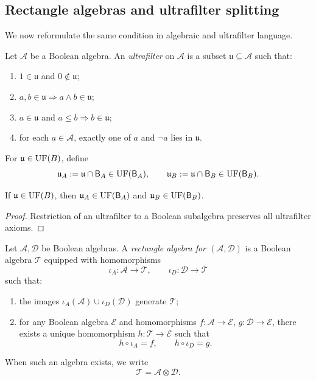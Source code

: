 \subsection{Rectangle algebras and ultrafilter splitting}
We now reformulate the same condition in algebraic and ultrafilter
language.
\begin{definition}[Ultrafilter]
	Let \(\mathcal A\) be a Boolean algebra. An \emph{ultrafilter} on
	\(\mathcal A\) is a subset \(\mathfrak u\subseteq\mathcal A\) such that:
	\begin{enumerate}
		\item \(1\in\mathfrak u\) and \(0\notin\mathfrak u\);
		\item \(a,b\in\mathfrak u\Rightarrow a\wedge b\in\mathfrak u\);
		\item \(a\in\mathfrak u\) and \(a\le b\Rightarrow b\in\mathfrak u\);
		\item for each \(a\in\mathcal A\), exactly one of \(a\) and \(\neg a\)
		      lies in \(\mathfrak u\).
	\end{enumerate}
\end{definition}
\begin{definition}[Marginals]
	For \(\mathfrak u\in\operatorname{UF}(B)\), define
	\[
		\mathfrak u_A:=\mathfrak u\cap\mathsf B_A\in\operatorname{UF}(\mathsf B_A),
		\qquad
		\mathfrak u_B:=\mathfrak u\cap\mathsf B_B\in\operatorname{UF}(\mathsf B_B).
	\]
\end{definition}
\begin{lemma}
	\label{lem:marginals}
	If \(\mathfrak u\in\operatorname{UF}(B)\), then \(\mathfrak u_A\in\operatorname{UF}(\mathsf B_A)\) and
	\(\mathfrak u_B\in\operatorname{UF}(\mathsf B_B)\).
\end{lemma}
\begin{proof}
	Restriction of an ultrafilter to a Boolean subalgebra preserves all
	ultrafilter axioms.
\end{proof}
\begin{definition}
	Let \(\mathcal A,\mathcal D\) be Boolean algebras. A \emph{rectangle
		algebra for \((\mathcal A,\mathcal D)\)} is a Boolean algebra
	\(\mathcal T\) equipped with homomorphisms
	\[
		\iota_A:\mathcal A\to\mathcal T,
		\qquad
		\iota_D:\mathcal D\to\mathcal T
	\]
	such that:
	\begin{enumerate}
		\item the images \(\iota_A(\mathcal A)\cup\iota_D(\mathcal D)\)
		      generate \(\mathcal T\);
		\item for any Boolean algebra \(\mathcal E\) and homomorphisms
		      \(f:\mathcal A\to\mathcal E\), \(g:\mathcal D\to\mathcal E\), there
		      exists a unique homomorphism \(h:\mathcal T\to\mathcal E\) such that
		      \[
			      h\circ\iota_A=f,
			      \qquad
			      h\circ\iota_D=g.
		      \]
	\end{enumerate}
	When such an algebra exists, we write
	\[
		\mathcal T=\mathcal A\otimes\mathcal D.
	\]
\end{definition}
